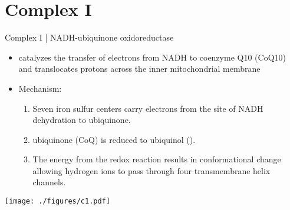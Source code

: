 \documentclass[presentation, smaller]{beamer}
\begin{document}
\section{Complex I}
\label{sec:org54d22f5}
\begin{frame}[label={sec:org68dca36}]{Complex I | NADH-ubiquinone oxidoreductase}
\begin{itemize}
\item catalyzes the transfer of electrons from NADH to coenzyme Q10
(CoQ10) and translocates protons across the inner mitochondrial
membrane
\end{itemize}

\centering
\small
{}


\begin{itemize}
\item Mechanism: 
\begin{enumerate}
\item Seven iron sulfur centers carry electrons from the site of NADH
dehydration to ubiquinone.

\item ubiquinone (CoQ) is reduced to ubiquinol ().

\item The energy from the redox reaction results in conformational
change allowing hydrogen ions to pass through four transmembrane
helix channels.
\end{enumerate}
\end{itemize}

\begin{center}
\texttt{[image: ./figures/c1.pdf]}
\end{center}
\end{frame}
\end{document}
